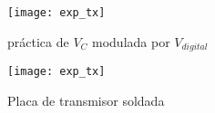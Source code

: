 \begin{figure}[h!]
    \centering
    \texttt{[image: exp\_tx]}
    \caption{práctica de $V_C$ modulada por $V_{digital}$}
    \label{fig:exp_vc_vdig}
\end{figure}

\begin{figure}[h!]
    \centering
    \texttt{[image: exp\_tx]}
    \caption{Placa de transmisor soldada}
    \label{fig:exp_placa_tx}
\end{figure}

% 
% 
